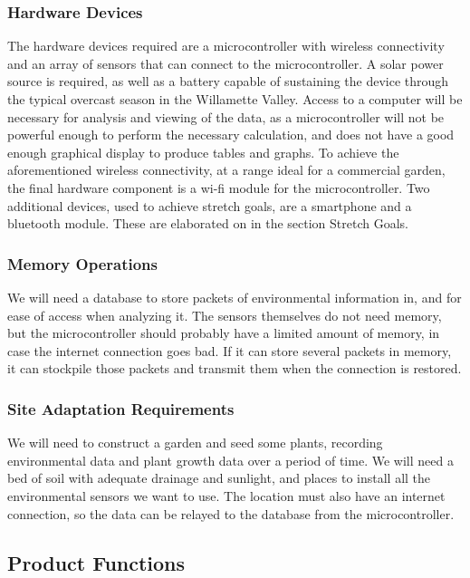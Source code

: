 \documentclass[IEEEtran,letterpaper,10pt,titlepage,fleqn,draftclsnofoot,onecolumn]{article}
\begin{document}
\subsubsection{Hardware Devices}

The hardware devices required are a microcontroller with wireless connectivity and an array of sensors that can connect to the microcontroller. A solar power source is required, as well as a battery capable of sustaining the device through the typical overcast season in the Willamette Valley. Access to a computer will be necessary for analysis and viewing of the data, as a microcontroller will not be powerful enough to perform the necessary calculation, and does not have a good enough graphical display to produce tables and graphs. To achieve the aforementioned wireless connectivity, at a range ideal for a commercial garden, the final hardware component is a wi-fi module for the microcontroller. Two additional devices, used to achieve stretch goals, are a smartphone and a bluetooth module. These are elaborated on in the section Stretch Goals.

\subsubsection{Memory Operations}

We will need a database to store packets of environmental information in, and for ease of access when analyzing it. The sensors themselves do not need memory, but the microcontroller should probably have a limited amount of memory, in case the internet connection goes bad. If it can store several packets in memory, it can stockpile those packets and transmit them when the connection is restored.  

\clearpage

\subsubsection{Site Adaptation Requirements}

We will need to construct a garden and seed some plants, recording environmental data and plant growth data over a period of time. We will need a bed of soil with adequate drainage and sunlight, and places to install all the environmental sensors we want to use. The location must also have an internet connection, so the data can be relayed to the database from the microcontroller. 

\subsection{Product Functions}
\end{document}
